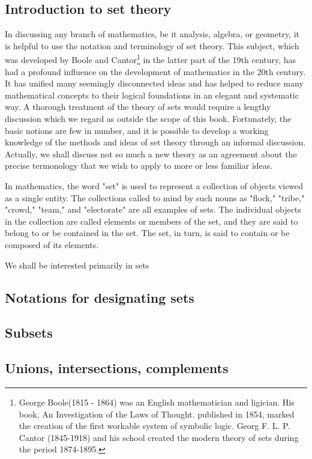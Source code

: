 \documentclass[cn,11pt,chinese]{elegantbook}
\numberwithin{equation}{section}
\begin{document}
\subsection{Introduction to set theory}
In discussing any branch of mathematics, be it analysis, algebra, or geometry, it is helpful to use the notation and terminology of set theory. This subject, which was developed by Boole and Cantor\footnote{George Boole(1815 - 1864) was an English mathematician and ligician. His book, An Investigation of the Laws of Thought. published in 1854, marked the creation of the first workable system of symbolic logic. Georg F. L. P. Cantor (1845-1918) and his school created the modern theory of sets during the period 1874-1895.} in the latter part of the 19th century, has had a profound influence on the development of mathematics in the 20th century. It has unified many seemingly disconnected ideas and has helped to reduce many mathematical concepts to their logical foundations in an elegant and systematic way.  A thorough treatment of the theory of sets would require a lengthy discussion which we regard as outside the scope of this book. Fortunately, the basic notions are few in number, and it is possible to develop a working knowledge of the methods and ideas of set theory through an informal discussion. Actually, we shall discuss not so much a new theory as an agreement about the precise termonology that we wish to apply to more  or less familiar ideas.

In mathematics, the word "set" is used to represent a collection of objects viewed as a single entity. The collections called to mind by such nouns as "flock," "tribe," "crowd," "team," and "electorate" are all examples of sets. The individual objects in the collection are called elements or members of the set, and they are said to belong to or be contained in the set. The set, in turn, is said to contain or be composed of its elements.

We shall be interested primarily in sets


\subsection{Notations for designating sets}


\subsection{Subsets}


\subsection{Unions, intersections, complements}
\end{document}
